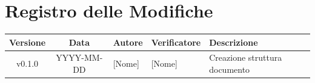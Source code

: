 \section*{Registro delle Modifiche}
\begin{table}[ht]
	\centering
	\renewcommand{\arraystretch}{1.5}
	\begin{tabularx}{\textwidth}{c c l l X}
		\toprule
		\textbf{Versione} & \textbf{Data} & \textbf{Autore} & \textbf{Verificatore} & \textbf{Descrizione} \\
		\midrule
		v0.1.0 & YYYY-MM-DD & {[Nome]} & {[Nome]} & Creazione struttura documento \\
		\bottomrule
	\end{tabularx}
\end{table}
